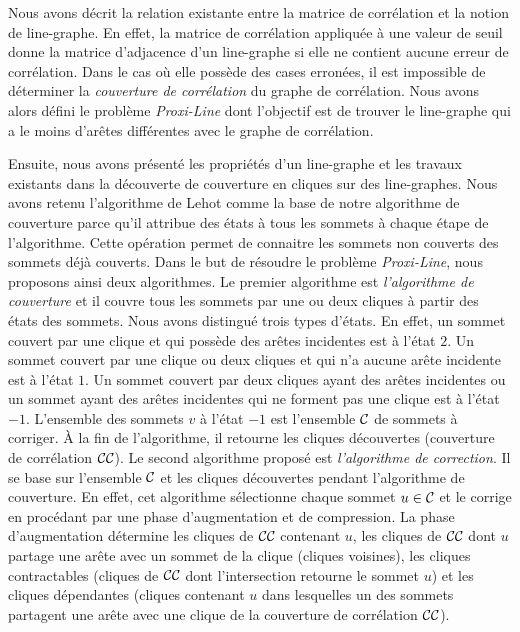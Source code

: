 Nous avons d\'ecrit la relation existante entre la matrice de corr\'elation et la notion de line-graphe. En effet, la matrice de corr\'elation appliqu\'ee \`a une valeur de seuil donne la matrice d'adjacence d'un line-graphe si elle ne contient aucune erreur de corr\'elation.  Dans le cas o\`u elle poss\`ede des cases erron\'ees, il est impossible de d\'eterminer la {\em couverture de corr\'elation} du graphe de corr\'elation. Nous avons alors d\'efini le probl\`eme {\em Proxi-Line} dont l'objectif est de trouver le line-graphe  qui a le moins d'ar\^etes diff\'erentes avec le graphe de corr\'elation.  
\newline

Ensuite, nous avons pr\'esent\'e les propri\'et\'es d'un line-graphe et les travaux existants dans la d\'ecouverte de couverture en cliques sur des line-graphes. Nous avons retenu l'algorithme de Lehot \cite{decompositionEnCliques} comme la base de notre algorithme de couverture parce qu'il attribue  des \'etats \`a tous les sommets \`a chaque \'etape de l'algorithme. Cette op\'eration permet de connaitre les sommets non couverts des sommets d\'ej\`a couverts. 
\newline
Dans le but de r\'esoudre le probl\`eme {\em Proxi-Line}, nous proposons ainsi deux algorithmes. 
\newline
Le premier algorithme est {\em l'algorithme de couverture} et il couvre tous les sommets par une ou deux cliques \`a partir des \'etats des sommets. Nous avons distingu\'e trois types d'\'etats.
En effet, un sommet couvert par une clique et qui poss\`ede des ar\^etes incidentes est \`a l'\'etat  $2$. Un sommet couvert par une clique ou deux cliques et qui n'a aucune ar\^ete incidente est \`a l'\'etat $1$. Un sommet couvert par deux cliques ayant des ar\^etes incidentes ou un sommet ayant des ar\^etes incidentes qui ne forment pas une clique est \`a l'\'etat $-1$. 
L'ensemble des sommets $v$ \`a l'\'etat $-1$ est l'ensemble $\cal C$ de sommets \`a corriger. \`A la fin de l'algorithme, il retourne les cliques d\'ecouvertes (couverture de corr\'elation $\cal CC$). 
\newline
Le second algorithme propos\'e est {\em l'algorithme de correction}. Il se base sur l'ensemble $\cal C$ et les cliques d\'ecouvertes pendant l'algorithme de couverture. 
En effet, cet algorithme s\'electionne chaque sommet $u \in \cal C$ et le corrige en proc\'edant par une phase d'augmentation et de compression.
La phase d'augmentation d\'etermine les cliques de $\cal CC$ contenant $u$, les cliques de $\cal CC$  dont $u$ partage une ar\^ete avec un sommet de la clique (cliques voisines), les cliques contractables (cliques de $\cal CC$ dont l'intersection retourne le sommet $u$) et les cliques d\'ependantes (cliques contenant $u$ dans lesquelles un des sommets partagent une ar\^ete avec une clique de la couverture  de corr\'elation $\cal CC$). 
